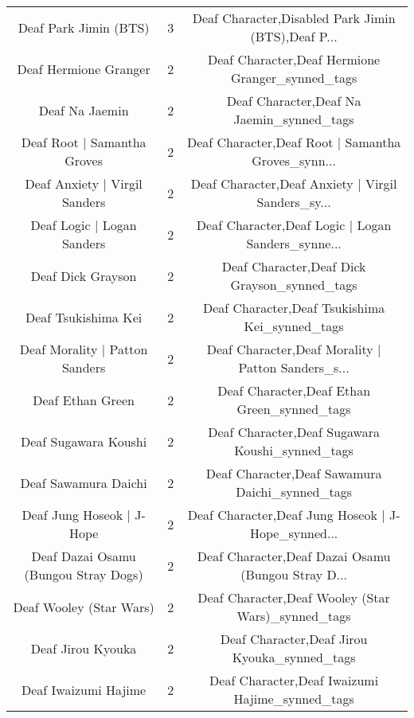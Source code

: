 \begin{table}[h!]
{\begin{tabular}{|c|c|c|}
                             Deaf Park Jimin (BTS) &          3 & Deaf Character,Disabled Park Jimin (BTS),Deaf P... \\
                             Deaf Hermione Granger &          2 &   Deaf Character,Deaf Hermione Granger\_synned\_tags \\
                                    Deaf Na Jaemin &          2 &          Deaf Character,Deaf Na Jaemin\_synned\_tags \\
                       Deaf Root | Samantha Groves &          2 & Deaf Character,Deaf Root | Samantha Groves\_synn... \\
                     Deaf Anxiety | Virgil Sanders &          2 & Deaf Character,Deaf Anxiety | Virgil Sanders\_sy... \\
                        Deaf Logic | Logan Sanders &          2 & Deaf Character,Deaf Logic | Logan Sanders\_synne... \\
                                 Deaf Dick Grayson &          2 &       Deaf Character,Deaf Dick Grayson\_synned\_tags \\
                               Deaf Tsukishima Kei &          2 &     Deaf Character,Deaf Tsukishima Kei\_synned\_tags \\
                    Deaf Morality | Patton Sanders &          2 & Deaf Character,Deaf Morality | Patton Sanders\_s... \\
                                  Deaf Ethan Green &          2 &        Deaf Character,Deaf Ethan Green\_synned\_tags \\
                              Deaf Sugawara Koushi &          2 &    Deaf Character,Deaf Sugawara Koushi\_synned\_tags \\
                              Deaf Sawamura Daichi &          2 &    Deaf Character,Deaf Sawamura Daichi\_synned\_tags \\
                         Deaf Jung Hoseok | J-Hope &          2 & Deaf Character,Deaf Jung Hoseok | J-Hope\_synned... \\
              Deaf Dazai Osamu (Bungou Stray Dogs) &          2 & Deaf Character,Deaf Dazai Osamu (Bungou Stray D... \\
                           Deaf Wooley (Star Wars) &          2 & Deaf Character,Deaf Wooley (Star Wars)\_synned\_tags \\
                                 Deaf Jirou Kyouka &          2 &       Deaf Character,Deaf Jirou Kyouka\_synned\_tags \\
                              Deaf Iwaizumi Hajime &          2 &    Deaf Character,Deaf Iwaizumi Hajime\_synned\_tags \\

\end{tabular}}
\end{table}
